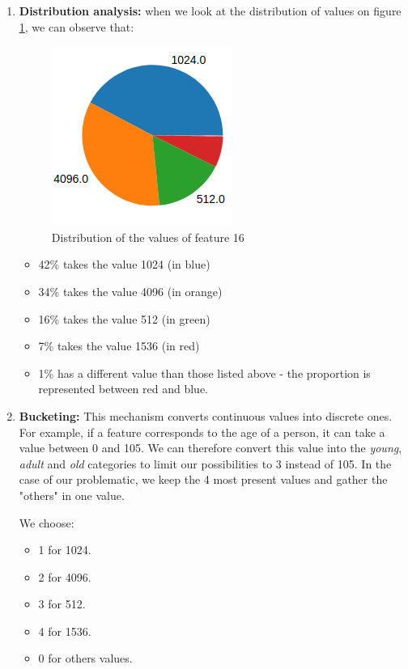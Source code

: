 \begin{enumerate}
    \item \textbf{Distribution analysis:} when we look at the distribution of values on figure \ref{fig:fv_repartition}, we can observe that:
    \begin{figure}[!h]
        \centering
          \includegraphics[width=0.30\linewidth]{Figures/fv_repartition.png}
          \caption{Distribution of the values of feature 16}
          \label{fig:fv_repartition}
        \end{figure}

    \begin{itemize}
        \item 42\% takes the value 1024 (in blue)
        \item 34\% takes the value 4096 (in orange)
        \item 16\% takes the value 512 (in green)
        \item 7\% takes the value 1536 (in red)
        \item 1\% has a different value than those listed above - the proportion is represented between red and blue.
    \end{itemize}
    
    \item \textbf{Bucketing:} This mechanism converts continuous values into discrete ones. For example, if a feature corresponds to the age of a person, it can take a value between 0 and 105. We can therefore convert this value into the \textit{young}, \textit{adult} and \textit{old} categories to limit our possibilities to 3 instead of 105. In the case of our problematic, we keep the 4 most present values and gather the "others" in one value.
    
    We choose: 
    \begin{itemize}
        \item 1 for 1024.
        \item 2 for 4096.
        \item 3 for 512.
        \item 4 for 1536.
        \item 0 for others values.
    \end{itemize}
    

\end{enumerate}
